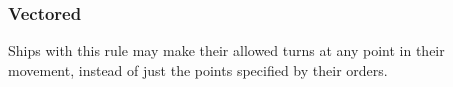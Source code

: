 \subsubsection{Vectored}

Ships with this rule may make their allowed turns at any point in their movement, instead of just the points specified by their orders.